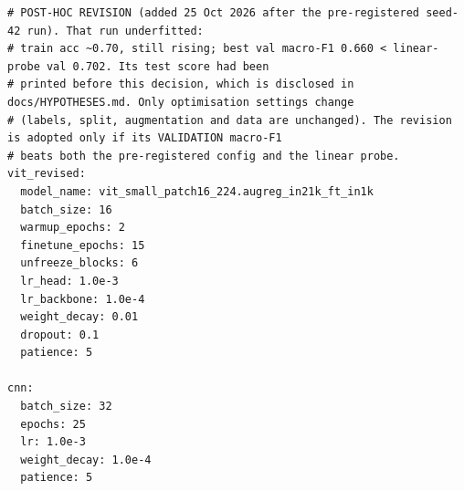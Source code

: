 \documentclass[11pt,a4paper]{article}
\begin{document}
\begin{verbatim}
# POST-HOC REVISION (added 25 Oct 2026 after the pre-registered seed-42 run). That run underfitted:
# train acc ~0.70, still rising; best val macro-F1 0.660 < linear-probe val 0.702. Its test score had been
# printed before this decision, which is disclosed in docs/HYPOTHESES.md. Only optimisation settings change
# (labels, split, augmentation and data are unchanged). The revision is adopted only if its VALIDATION macro-F1
# beats both the pre-registered config and the linear probe.
vit_revised:
  model_name: vit_small_patch16_224.augreg_in21k_ft_in1k
  batch_size: 16
  warmup_epochs: 2
  finetune_epochs: 15
  unfreeze_blocks: 6
  lr_head: 1.0e-3
  lr_backbone: 1.0e-4
  weight_decay: 0.01
  dropout: 0.1
  patience: 5

cnn:
  batch_size: 32
  epochs: 25
  lr: 1.0e-3
  weight_decay: 1.0e-4
  patience: 5

\end{verbatim}
\end{document}
